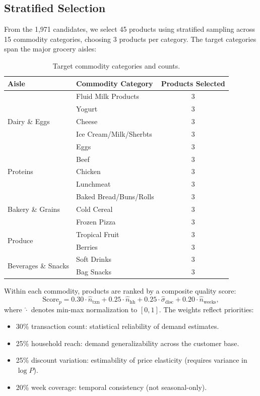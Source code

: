 \documentclass[11pt,a4paper]{article}
\begin{document}
\subsection{Stratified Selection}

From the 1,971 candidates, we select 45 products using stratified sampling across 15 commodity categories, choosing 3 products per category.
The target categories span the major grocery aisles:

\begin{table}[H]
\centering
\caption{Target commodity categories and counts.}
\begin{tabular}{@{}llc@{}}
\toprule
\textbf{Aisle} & \textbf{Commodity Category} & \textbf{Products Selected} \\
\midrule
\multirow{5}{*}{Dairy \& Eggs} & Fluid Milk Products & 3 \\
 & Yogurt & 3 \\
 & Cheese & 3 \\
 & Ice Cream/Milk/Sherbts & 3 \\
 & Eggs & 3 \\
\midrule
\multirow{3}{*}{Proteins} & Beef & 3 \\
 & Chicken & 3 \\
 & Lunchmeat & 3 \\
\midrule
\multirow{3}{*}{Bakery \& Grains} & Baked Bread/Buns/Rolls & 3 \\
 & Cold Cereal & 3 \\
 & Frozen Pizza & 3 \\
\midrule
\multirow{2}{*}{Produce} & Tropical Fruit & 3 \\
 & Berries & 3 \\
\midrule
\multirow{2}{*}{Beverages \& Snacks} & Soft Drinks & 3 \\
 & Bag Snacks & 3 \\
\bottomrule
\end{tabular}
\end{table}

Within each commodity, products are ranked by a composite quality score:
\begin{equation}
\text{Score}_p = 0.30 \cdot \hat{n}_{\text{txn}} + 0.25 \cdot \hat{n}_{\text{hh}} + 0.25 \cdot \hat{\sigma}_{\text{disc}} + 0.20 \cdot \hat{n}_{\text{weeks}},
\end{equation}
where $\hat{\cdot}$ denotes min-max normalization to $[0,1]$.
The weights reflect priorities:
\begin{itemize}
    \item 30\% transaction count: statistical reliability of demand estimates.
    \item 25\% household reach: demand generalizability across the customer base.
    \item 25\% discount variation: estimability of price elasticity (requires variance in $\log P$).
    \item 20\% week coverage: temporal consistency (not seasonal-only).
\end{itemize}
\end{document}
